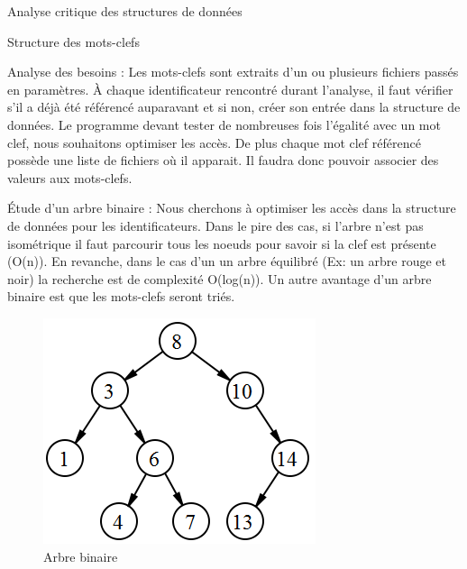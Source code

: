 \documentclass{article}
\begin{document}
\begin{section}{Analyse critique des structures de données}


  \begin{subsection}{Structure des mots-clefs}
    \begin {paragraph}{Analyse des besoins :}
    Les mots-clefs sont extraits d'un ou plusieurs fichiers passés en paramètres. À chaque identificateur rencontré durant l'analyse,
    il faut vérifier s'il a déjà été référencé auparavant et si non, créer son entrée dans la structure de données. Le programme devant
    tester de nombreuses fois l'égalité avec un mot clef, nous souhaitons optimiser les accès. De plus chaque mot clef référencé 
    possède une liste de fichiers où il apparait. Il faudra donc pouvoir associer des valeurs aux mots-clefs.
    \end{paragraph}
    
    \begin{paragraph}{Étude d'un arbre binaire :}
     Nous cherchons à optimiser les accès dans la structure de données pour les identificateurs. Dans le pire des cas, si l'arbre
     n'est pas isométrique il faut parcourir tous les noeuds pour savoir si la clef est présente (O(n)). En revanche, dans le cas d'un 
     un arbre équilibré (Ex: un arbre rouge et noir) la recherche est de complexité O(log(n)).
     Un autre avantage d'un arbre binaire est que les mots-clefs seront triés.
     
    \begin{figure}[htp]
    \centering
    \includegraphics[scale=0.5]{images/arbre.png}
    \caption{Arbre binaire}
    \end{figure}


\end{paragraph}
\end{subsection}
\end{section}
\end{document}
